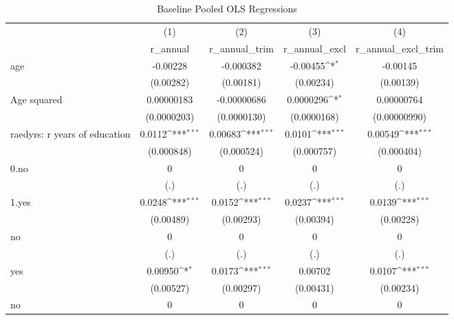 \begin{table}[htbp]\centering
\def\sym#1{\ifmmode^{#1}\else\(^{#1}\)\fi}
\caption{Baseline Pooled OLS Regressions}
\begin{tabular}{l*{4}{c}}
\toprule
                &\multicolumn{1}{c}{(1)}&\multicolumn{1}{c}{(2)}&\multicolumn{1}{c}{(3)}&\multicolumn{1}{c}{(4)}\\
                &\multicolumn{1}{c}{r\_annual}&\multicolumn{1}{c}{r\_annual\_trim}&\multicolumn{1}{c}{r\_annual\_excl}&\multicolumn{1}{c}{r\_annual\_excl\_trim}\\
\midrule
age             & -0.00228         &-0.000382         & -0.00455\sym{*}  & -0.00145         \\
                &(0.00282)         &(0.00181)         &(0.00234)         &(0.00139)         \\
Age squared     &0.00000183         &-0.00000686         &0.0000296\sym{*}  &0.00000764         \\
                &(0.0000203)         &(0.0000130)         &(0.0000168)         &(0.00000990)         \\
raedyrs: r years of education&   0.0112\sym{***}&  0.00683\sym{***}&   0.0101\sym{***}&  0.00549\sym{***}\\
                &(0.000848)         &(0.000524)         &(0.000757)         &(0.000404)         \\
0.no            &        0         &        0         &        0         &        0         \\
                &      (.)         &      (.)         &      (.)         &      (.)         \\
1.yes           &   0.0248\sym{***}&   0.0152\sym{***}&   0.0237\sym{***}&   0.0139\sym{***}\\
                &(0.00489)         &(0.00293)         &(0.00394)         &(0.00228)         \\
no              &        0         &        0         &        0         &        0         \\
                &      (.)         &      (.)         &      (.)         &      (.)         \\
yes             &  0.00950\sym{*}  &   0.0173\sym{***}&  0.00702         &   0.0107\sym{***}\\
                &(0.00527)         &(0.00297)         &(0.00431)         &(0.00234)         \\
no              &        0         &        0         &        0         &        0         \\

\end{tabular}
\end{table}
